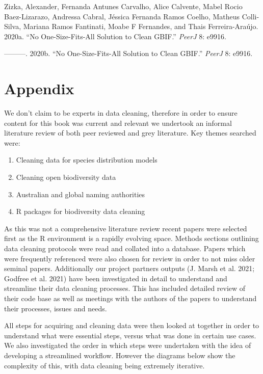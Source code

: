 \documentclass[
  letterpaper,
  DIV=11,
  numbers=noendperiod,
  oneside]{scrreprt}
\newlength{\cslhangindent}
\newlength{\cslentryspacingunit} %
\newenvironment{CSLReferences}[2] %
 {%
  \setlength{\parindent}{0pt}
  \ifodd #1
  \let\oldpar\par
  \def\par{\hangindent=\cslhangindent\oldpar}
  \fi
  \setlength{\parskip}{#2\cslentryspacingunit}
 }%
 {}
\begin{document}
\begin{CSLReferences}{1}{0}
\leavevmode{}%
Zizka, Alexander, Fernanda Antunes Carvalho, Alice Calvente, Mabel Rocio
Baez-Lizarazo, Andressa Cabral, Jéssica Fernanda Ramos Coelho, Matheus
Colli-Silva, Mariana Ramos Fantinati, Moabe F Fernandes, and Thais
Ferreira-Araújo. 2020a. {``No One-Size-Fits-All Solution to Clean
{GBIF}.''} \emph{PeerJ} 8: e9916.

\leavevmode{}%
---------. 2020b. {``No One-Size-Fits-All Solution to Clean GBIF.''}
\emph{PeerJ} 8: e9916.

\end{CSLReferences}


\hypertarget{sec-appendix}{%
\chapter{Appendix}\label{sec-appendix}}

We don't claim to be experts in data cleaning, therefore in order to
ensure content for this book was current and relevant we undertook an
informal literature review of both peer reviewed and grey literature.
Key themes searched were:

\begin{enumerate}
\def\labelenumi{\arabic{enumi}.}
\item
  Cleaning data for species distribution models
\item
  Cleaning open biodiversity data
\item
  Australian and global naming authorities
\item
  R packages for biodiversity data cleaning
\end{enumerate}

As this was not a comprehensive literature review recent papers were
selected first as the R environment is a rapidly evolving space. Methods
sections outlining data cleaning protocols were read and collated into a
database. Papers which were frequently referenced were also chosen for
review in order to not miss older seminal papers. Additionally our
project partners outputs (J. Marsh et al. 2021; Godfree et al. 2021)
have been investigated in detail to understand and streamline their data
cleaning processes. This has included detailed review of their code base
as well as meetings with the authors of the papers to understand their
processes, issues and needs.

All steps for acquiring and cleaning data were then looked at together
in order to understand what were essential steps, versus what was done
in certain use cases. We also investigated the order in which steps were
undertaken with the idea of developing a streamlined workflow. However
the diagrams below show the complexity of this, with data cleaning being
extremely iterative.
\end{document}
